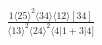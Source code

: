 \documentclass[varwidth, border=5pt]{standalone}
\begin{document}
\begin{my}
$\begin{gathered}
\scriptscriptstyle\frac{1⟨25⟩^2⟨34⟩⟨12⟩[34]}{⟨13⟩^2⟨24⟩^2⟨4|1+3|4]}
\end{gathered}$
\end{my}
\end{document}
